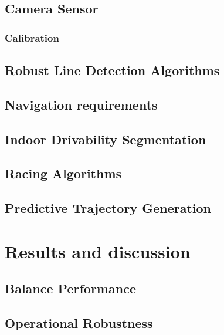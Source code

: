         \subsection{Camera Sensor}

        \subsubsection{Calibration}

        \subsection{Robust Line Detection Algorithms}

        \subsection{Navigation requirements}

        \subsection{Indoor Drivability Segmentation}

        \subsection{Racing Algorithms}

        \subsection{Predictive Trajectory Generation}
    
    \pagebreak{}


  \section{Results and discussion} %
    \subsection{Balance Performance}

    \subsection{Operational Robustness}
